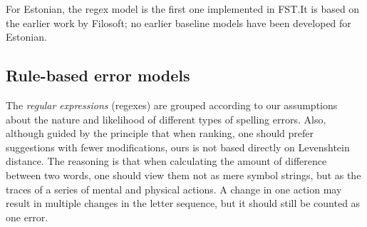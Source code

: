 \documentclass{flammie}
\begin{document}
For Estonian, the regex model is the first one implemented in FST.\@ It is based
on the earlier work by Filosoft; no earlier baseline models have been developed
for Estonian.

\subsection{Rule-based error models}

The \textit{regular expressions} (regexes) are grouped according to our
assumptions about the nature and likelihood of different types of spelling
errors. Also, although guided by the principle that when ranking, one should
prefer suggestions with fewer modifications, ours is not based directly on
Levenshtein distance. The reasoning is that when calculating the amount of
difference between two words, one should view them not as mere symbol strings,
but as the traces of a series of mental and physical actions. A change in one
action may result in multiple changes in the letter sequence, but it should
still be counted as one error.
\end{document}
